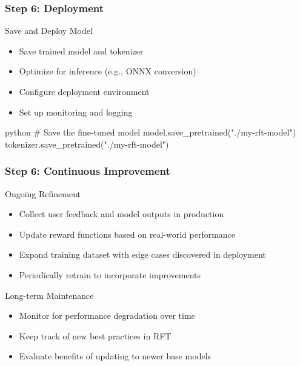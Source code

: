 \documentclass[aspectratio=169]{beamer}
\begin{document}
\begin{frame}[fragile]
	\frametitle{Step 6: Deployment}
	\begin{block}{Save and Deploy Model}
		\begin{itemize}
			\item Save trained model and tokenizer
			\item Optimize for inference (e.g., ONNX conversion) 
			\item Configure deployment environment
			\item Set up monitoring and logging
		\end{itemize}
	\end{block}
	\begin{mintedbox}{python}
# Save the fine-tuned model
model.save_pretrained("./my-rft-model")
tokenizer.save_pretrained("./my-rft-model")
	\end{mintedbox}
\end{frame}

\begin{frame}
	\frametitle{Step 6: Continuous Improvement}
	\begin{block}{Ongoing Refinement}
		\begin{itemize}
			\item Collect user feedback and model outputs in production
			\item Update reward functions based on real-world performance
			\item Expand training dataset with edge cases discovered in deployment
			\item Periodically retrain to incorporate improvements
		\end{itemize}
	\end{block}
	\begin{block}{Long-term Maintenance}
		\begin{itemize}
			\item Monitor for performance degradation over time
			\item Keep track of new best practices in RFT 
			\item Evaluate benefits of updating to newer base models
		\end{itemize}
	\end{block}
\end{frame}
\end{document}
